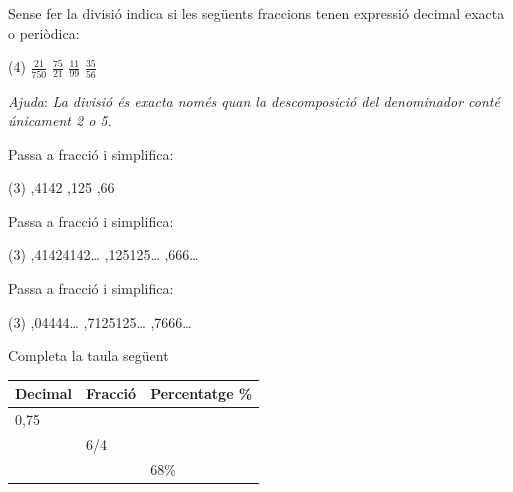 \begin{mylist}
	\exer  Sense fer la divisió indica si les següents fraccions tenen expressió decimal exacta o periòdica:
 
\begin{tasks}(4)
	\task  $\frac{21}{750} $ 
	\task $\frac{75}{21} $
	\task $\frac{11}{99} $
	\task $\frac{35}{56} $
\end{tasks} 

\textit{Ajuda}: \textit{La divisió és exacta només quan la descomposició del denominador conté únicament 2 o 5.}

 
	\exer Passa a fracció i simplifica:
	\begin{tasks}(3)
		,4142  
		,125 
		,66
	\end{tasks}
	
	\exer Passa a fracció i simplifica:
 \begin{tasks}(3)
 	,41424142{\dots}  
 	,125125{\dots} 
 	,666{\dots}
 \end{tasks}
 
 
	\exer  Passa a fracció i simplifica:
 \begin{tasks}(3)
 	,04444{\dots} 
 	,7125125{\dots}
 	,7666{\dots}
 \end{tasks}

\vspace{2cm}
 
	\exer  \spen  Completa la taula següent
 
\begin{tabular}{|p{}|p{}|p{}|} \hline 
	\rowcolor{lightgray} Decimal & Fracció & Percentatge \% \\ \hline 
	0,75 &  &  \\ \hline 
	& 6/4 &  \\ \hline 
	&  & 68\% \\ \hline 
\end{tabular}


\end{mylist}
